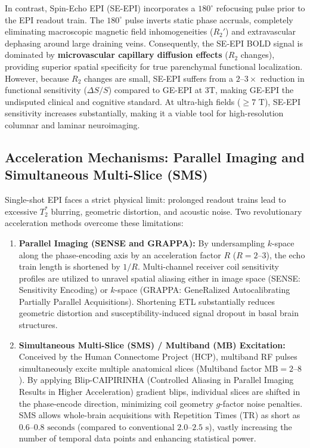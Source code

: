 \documentclass[11pt,a4paper]{article}
\begin{document}
In contrast, Spin-Echo EPI (SE-EPI) incorporates a $180^\circ$ refocusing pulse prior to the EPI readout train. The $180^\circ$ pulse inverts static phase accruals, completely eliminating macroscopic magnetic field inhomogeneities ($R_2'$) and extravascular dephasing around large draining veins. Consequently, the SE-EPI BOLD signal is dominated by \textbf{microvascular capillary diffusion effects} ($R_2$ changes), providing superior spatial specificity for true parenchymal functional localization. However, because $R_2$ changes are small, SE-EPI suffers from a $2\text{--}3\times$ reduction in functional sensitivity ($\Delta S/S$) compared to GE-EPI at 3T, making GE-EPI the undisputed clinical and cognitive standard. At ultra-high fields ($\ge 7\text{ T}$), SE-EPI sensitivity increases substantially, making it a viable tool for high-resolution columnar and laminar neuroimaging.

\subsection{Acceleration Mechanisms: Parallel Imaging and Simultaneous Multi-Slice (SMS)}
Single-shot EPI faces a strict physical limit: prolonged readout trains lead to excessive $T_2^*$ blurring, geometric distortion, and acoustic noise. Two revolutionary acceleration methods overcome these limitations:
\begin{enumerate}[leftmargin=2em]
    \item \textbf{Parallel Imaging (SENSE and GRAPPA):} By undersampling $k$-space along the phase-encoding axis by an acceleration factor $R$ ($R = 2\text{--}3$), the echo train length is shortened by $1/R$. Multi-channel receiver coil sensitivity profiles are utilized to unravel spatial aliasing either in image space (SENSE: Sensitivity Encoding) or $k$-space (GRAPPA: GeneRalized Autocalibrating Partially Parallel Acquisitions). Shortening ETL substantially reduces geometric distortion and susceptibility-induced signal dropout in basal brain structures.
    \item \textbf{Simultaneous Multi-Slice (SMS) / Multiband (MB) Excitation:} Conceived by the Human Connectome Project (HCP), multiband RF pulses simultaneously excite multiple anatomical slices (Multiband factor $\text{MB} = 2\text{--}8$). By applying Blip-CAIPIRINHA (Controlled Aliasing in Parallel Imaging Results in Higher Acceleration) gradient blips, individual slices are shifted in the phase-encode direction, minimizing coil geometry $g$-factor noise penalties. SMS allows whole-brain acquisitions with Repetition Times ($\text{TR}$) as short as $0.6\text{--}0.8\text{ seconds}$ (compared to conventional $2.0\text{--}2.5\text{ s}$), vastly increasing the number of temporal data points and enhancing statistical power.
\end{enumerate}
\end{document}
